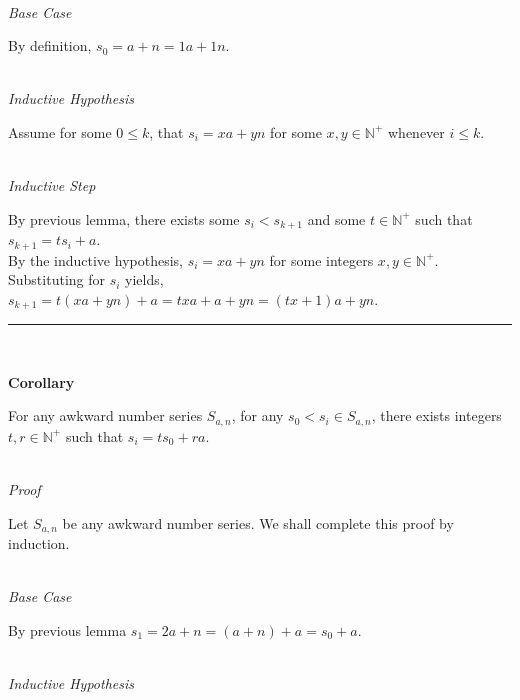 \documentclass[a4paper,12pt]{article}
\begin{document}
\noindent \\
\textit{Base Case}

\noindent By definition, $s_0 = a + n = 1a + 1n$.


\noindent \\
\textit{Inductive Hypothesis}

\noindent Assume for some $0 \leq k$, that $s_i = xa + yn$ for some $x, y \in \mathbb{N}^+$ whenever $i \leq k$.


\noindent \\
\textit{Inductive Step}

\noindent By previous lemma, there exists some $s_i < s_{k+1}$ and some $t \in \mathbb{N}^+$ such that $s_{k+1} = ts_i + a$.\\

\noindent By the inductive hypothesis, $s_i = xa + yn$ for some integers $x, y \in \mathbb{N}^+$.\\

\noindent Substituting for $s_i$ yields, $s_{k+1} = t(xa + yn) + a = txa + a + yn = (tx + 1)a + yn$.\\



\begin{center}
\noindent\rule{8cm}{0.4pt}
\end{center}
\noindent \\







\label{corollary:relation_to_initial}
\hypertarget{corollary:relation_to_initial}{}
\begin{tcolorbox}
\textbf{Corollary}

For any awkward number series $S_{a,n}$, for any $s_0 < s_i \in S_{a,n}$, there exists integers $t, r \in \mathbb{N}^+$ such that $s_i = ts_0 + ra$.

\end{tcolorbox}


\noindent \\
\textit{Proof}

\noindent Let $S_{a, n}$ be any awkward number series. We shall complete this proof by induction.


\noindent \\
\textit{Base Case}

\noindent By previous lemma $s_1 = 2a + n = (a + n) + a = s_0 + a$.


\noindent \\
\textit{Inductive Hypothesis}
\end{document}

